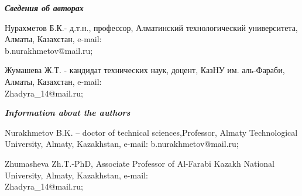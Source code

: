 \begin{authorinfo}
\hspace{1em}\emph{{\bfseries Сведения об авторах}}

Нурахметов Б.К.- д.т.н., профессор, Алматинский технологический
университета, Алматы, Казахстан, e-mail: \\b.nurakhmetov@mail.ru;

Жумашева Ж.Т. - кандидат технических наук, доцент, КазНУ им. аль-Фараби,
Алматы, Казахстан, e-mail: \\Zhadyra\_14@mail.ru;

\hspace{1em}\emph{{\bfseries Information about the authors}}

Nurakhmetov B.K. -- doctor of technical sciences,Professor, Almaty
Technological University, Almaty, Kazakhstan, e-mail: b.nurakhmetov@mail.ru;

Zhumasheva Zh.T.-PhD, Associate Professor of Al-Farabi Kazakh National
University, Almaty, Kazakhstan, e-mail:\\ Zhadyra\_14@mail.ru;
\end{authorinfo}
